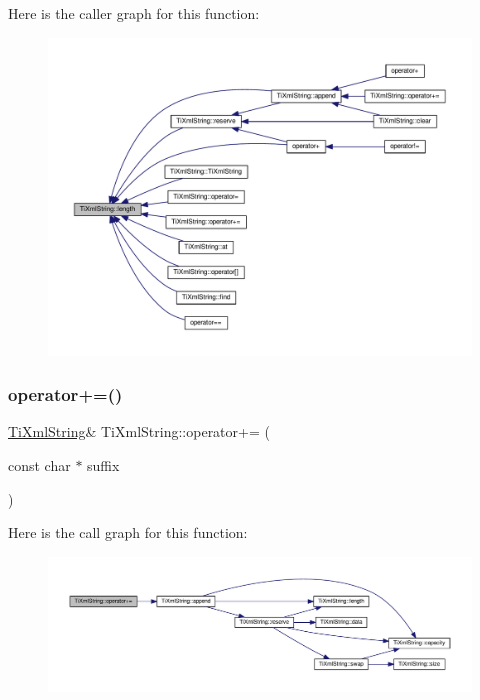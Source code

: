 Here is the caller graph for this function\+:\nopagebreak
\begin{figure}[H]
\begin{center}
\leavevmode
\includegraphics[width=350pt]{class_ti_xml_string_a5db17f8314ffe2a89df0f0eb6c2a4bf5_icgraph}
\end{center}
\end{figure}
\mbox{\label{class_ti_xml_string_ab56336ac2aa2a08d24a71eb9a2b502a5}} 
\subsubsection{\texorpdfstring{operator+=()}{operator+=()}\hspace{0.1cm}{\footnotesize\ttfamily [1/3]}}
{\footnotesize\ttfamily \hyperlink{class_ti_xml_string}{Ti\+Xml\+String}\& Ti\+Xml\+String\+::operator+= (\begin{DoxyParamCaption}\item[{const char $\ast$}]{suffix }\end{DoxyParamCaption})\hspace{0.3cm}{\ttfamily [inline]}}

Here is the call graph for this function\+:\nopagebreak
\begin{figure}[H]
\begin{center}
\leavevmode
\includegraphics[width=350pt]{class_ti_xml_string_ab56336ac2aa2a08d24a71eb9a2b502a5_cgraph}
\end{center}
\end{figure}
\mbox{\label{class_ti_xml_string_a6aa09d5240470b76d54ec709e04f8c13}} 
